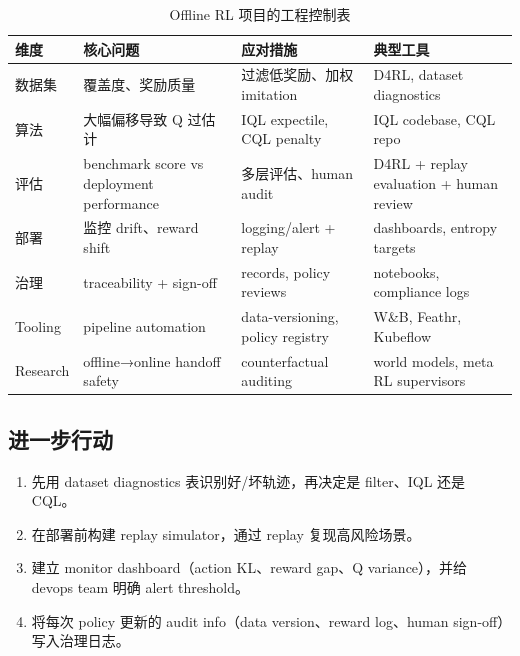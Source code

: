 \documentclass[a4paper]{article}
\begin{document}
\begin{table}[H]
\centering
\begin{tabular}{p{} p{} p{} p{}}
\toprule
维度 & 核心问题 & 应对措施 & 典型工具 \\
\midrule
数据集 & 覆盖度、奖励质量 & 过滤低奖励、加权 imitation & D4RL, dataset diagnostics \\
算法 & 大幅偏移导致 Q 过估计 & IQL expectile, CQL penalty & IQL codebase, CQL repo \\
评估 & benchmark score vs deployment performance & 多层评估、human audit & D4RL + replay evaluation + human review \\
部署 & 监控 drift、reward shift & logging/alert + replay & dashboards, entropy targets \\
治理 & traceability + sign-off & records, policy reviews & notebooks, compliance logs \\
Tooling & pipeline automation & data-versioning, policy registry & W\&B, Feathr, Kubeflow \\
Research & offline→online handoff safety & counterfactual auditing & world models, meta RL supervisors \\
\bottomrule
\end{tabular}
\caption{Offline RL 项目的工程控制表}
\end{table}

\subsection{进一步行动}

\begin{enumerate}
    \item 先用 dataset diagnostics 表识别好/坏轨迹，再决定是 filter、IQL 还是 CQL。
    \item 在部署前构建 replay simulator，通过 replay 复现高风险场景。
    \item 建立 monitor dashboard（action KL、reward gap、Q variance），并给 devops team 明确 alert threshold。
    \item 将每次 policy 更新的 audit info（data version、reward log、human sign-off）写入治理日志。
\end{enumerate}
\end{document}
